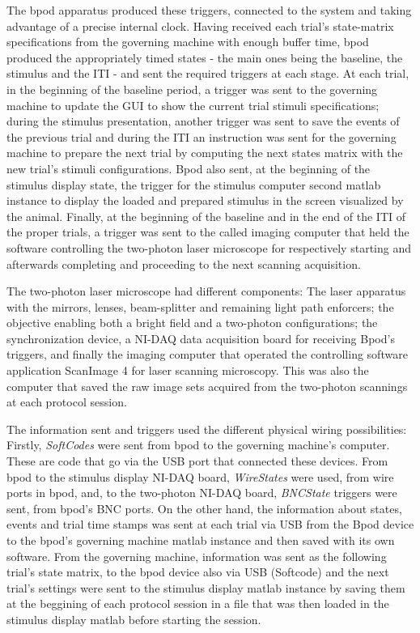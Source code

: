 The bpod apparatus produced these triggers, connected to the system and taking advantage of a precise internal clock. Having received each trial's state-matrix specifications from the governing machine with enough buffer time, bpod produced the appropriately timed states - the main ones being the baseline, the stimulus and the ITI - and sent the required triggers at each stage. At each trial, in the beginning of the baseline period, a trigger was sent to the governing machine to update the GUI to show the current trial stimuli specifications; during the stimulus presentation, another trigger was sent to save the events of the previous trial and during the ITI an instruction was sent for the governing machine to prepare the next trial by computing the next states matrix with the new trial's stimuli configurations. Bpod also sent, at the beginning of the stimulus display state, the trigger for the stimulus computer second matlab instance to display the loaded and prepared stimulus in the screen visualized by the animal. Finally, at the beginning of the baseline and in the end of the ITI of the proper trials, a trigger was sent to the called imaging computer that held the software controlling the two-photon laser microscope for respectively starting and afterwards completing and proceeding to the next scanning acquisition. 

The two-photon laser microscope had different components: The laser apparatus with the mirrors, lenses, beam-splitter and remaining light path enforcers; the objective enabling both a bright field and a two-photon configurations; the synchronization device, a NI-DAQ data acquisition board for receiving Bpod's triggers, and finally the imaging computer that operated the controlling software application ScanImage 4 for laser scanning microscopy. This was also the computer that saved the raw image sets acquired from the two-photon scannings at each protocol session.

The information sent and triggers used the different physical wiring possibilities: Firstly, \textit{SoftCodes} were sent from bpod to the governing machine's computer. These are code that go via the USB port that connected these devices. From bpod to the stimulus display NI-DAQ board, \textit{WireStates} were used, from wire ports in bpod, and, to the two-photon NI-DAQ board, \textit{BNCState} triggers were sent, from bpod's BNC ports. On the other hand, the information about states, events and trial time stamps was sent at each trial via USB from the Bpod device to the bpod's governing machine matlab instance and then saved with its own software. 
From the governing machine, information was sent as the following trial's state matrix, to the bpod device also via USB (Softcode) and the next trial's settings were sent to the stimulus display matlab instance by saving them at the beggining of  each protocol session in a file that was then loaded in the stimulus display matlab before starting the session.